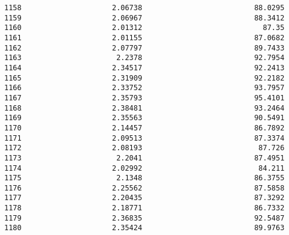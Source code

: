 \documentclass[11pt]{article}
\begin{document}
\begin{tcolorbox}[breakable, size=fbox, boxrule=.5pt, pad at break*=1mm, opacityfill=0]
\begin{Verbatim}[commandchars=\\\{\}]
1158                     2.06738                          88.0295
1159                     2.06967                          88.3412
1160                     2.01312                            87.35
1161                     2.01155                          87.0682
1162                     2.07797                          89.7433
1163                      2.2378                          92.7954
1164                     2.34517                          92.2413
1165                     2.31909                          92.2182
1166                     2.33752                          93.7957
1167                     2.35793                          95.4101
1168                     2.38481                          93.2464
1169                     2.35563                          90.5491
1170                     2.14457                          86.7892
1171                     2.09513                          87.3374
1172                     2.08193                           87.726
1173                      2.2041                          87.4951
1174                     2.02992                           84.211
1175                      2.1348                          86.3755
1176                     2.25562                          87.5858
1177                     2.20435                          87.3292
1178                     2.18771                          86.7332
1179                     2.36835                          92.5487
1180                     2.35424                          89.9763


\end{Verbatim}
\end{tcolorbox}
\end{document}
